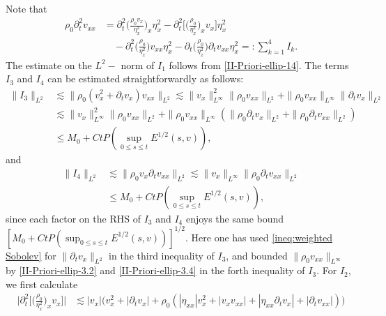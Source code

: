 \documentclass[11pt, reqno]{amsart}
\numberwithin{equation}{section}
\begin{document}
{Note that
\begin{equation*}
\begin{aligned}
\rho_0\partial_t^2v_{xx}&=\partial_t^2\bigg(\frac{\rho_0v_x}{\eta_x^2}\bigg)_{x}\eta_x^2
-\partial_t^2\bigg[\bigg(\frac{\rho_0}{\eta_x^2}\bigg)_xv_{x}\bigg]\eta_x^2\\
&\quad-\partial_t^2\bigg(\frac{\rho_0}{\eta_x^2}\bigg)v_{xx}\eta_x^2
-\partial_t\bigg(\frac{\rho_0}{\eta_x^2}\bigg)\partial_tv_{xx}\eta_x^2
=\colon\sum_{k=1}^4I_k.
\end{aligned}
\end{equation*}
The estimate on the \(L^2-\) norm of \(I_1\) follows from \eqref{II-Priori-ellip-14}.
The terms \(I_3\) and \(I_4\) can be estimated straightforwardly as follows:
\begin{equation*}
\begin{aligned}
\|I_3\|_{L^2}
&\lesssim \|\rho_0(v_x^2+\partial_tv_x)v_{xx}\|_{L^2}
\lesssim \|v_{x}\|_{L^\infty}^2\|\rho_0v_{xx}\|_{L^2}
+\|\rho_0v_{xx}\|_{L^\infty}\|\partial_tv_x\|_{L^2}\\
&\lesssim \|v_{x}\|_{L^\infty}^2\|\rho_0v_{xx}\|_{L^2}
+\|\rho_0v_{xx}\|_{L^\infty}(\|\rho_0\partial_tv_x\|_{L^2}
+\|\rho_0\partial_tv_{xx}\|_{L^2})\\
&\leq M_0+Ct P(\sup_{0\leq s\leq t}E^{1/2}(s,v)),
\end{aligned}
\end{equation*}
and
\begin{equation*}
\begin{aligned}
\|I_4\|_{L^2}
&\lesssim \|\rho_0v_x\partial_tv_{xx}\|_{L^2}
\lesssim \|v_{x}\|_{L^\infty}\|\rho_0\partial_tv_{xx}\|_{L^2}\\
&\leq M_0+Ct P(\sup_{0\leq s\leq t}E^{1/2}(s,v)),
\end{aligned}
\end{equation*}
since each factor on the RHS of \(I_3\) and \(I_4\) enjoys the same bound \([M_0+Ct P(\sup_{0\leq s\leq t}E^{1/2}(s,v))]^{1/2}\).
Here one has used \eqref{ineq:weighted Sobolev} for \(\|\partial_tv_x\|_{L^2}\) in the third inequality of \(I_3\), and bounded \(\|\rho_0v_{xx}\|_{L^\infty}\) by \eqref{II-Priori-ellip-3.2} and \eqref{II-Priori-ellip-3.4} in the forth inequality of \(I_3\).
For \(I_2\), we first calculate
{\small \begin{equation*}
\begin{aligned}
\bigg|\partial_t^2\bigg[\bigg(\frac{\rho_0}{\eta_x^2}\bigg)_xv_{x}\bigg]\bigg|
&\lesssim |v_x|\big(v_x^2+|\partial_tv_x|
+\rho_0(|\eta_{xx}|v_x^2
+|v_xv_{xx}|+|\eta_{xx}\partial_tv_x|+|\partial_tv_{xx}|)\big)\\

\end{aligned}
\end{equation*}}}
\end{document}
